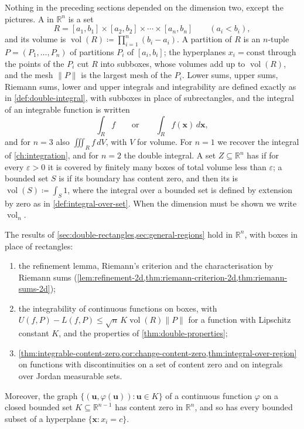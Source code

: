 Nothing in the preceding sections depended on the dimension two, except the pictures. A  in $\mathbb R^n$ is a set
\[
R=[a_1,b_1]\times[a_2,b_2]\times\cdots\times[a_n,b_n]\qquad(a_i<b_i),
\]
and its volume is $\operatorname{vol}(R)\coloneqq\prod_{i=1}^n(b_i-a_i)$. A partition of $R$ is an $n$-tuple $P=(P_1,\ldots,P_n)$ of partitions $P_i$ of $[a_i,b_i]$; the hyperplanes $x_i=\text{const}$ through the points of the $P_i$ cut $R$ into subboxes, whose volumes add up to $\operatorname{vol}(R)$, and the mesh $\|P\|$ is the largest mesh of the $P_i$. Lower sums, upper sums, Riemann sums, lower and upper integrals and integrability are defined exactly as in \cref{def:double-integral}, with subboxes in place of subrectangles, and the integral of an integrable function is written
\[
\int_Rf\qquad\text{or}\qquad\int_Rf(\mathbf x)\,d\mathbf x ,
\]
and for $n=3$ also $\iiint_Rf\,dV$, with $V$ for volume. For $n=1$ we recover the integral of \cref{ch:integration}, and for $n=2$ the double integral. A set $Z\subseteq\mathbb R^n$ has  if for every $\varepsilon>0$ it is covered by finitely many boxes of total volume less than $\varepsilon$; a bounded set $S$ is  if its boundary has content zero, and then its  is $\operatorname{vol}(S)\coloneqq\int_S1$, where the integral over a bounded set is defined by extension by zero as in \cref{def:integral-over-set}. When the dimension must be shown we write $\operatorname{vol}_n$.

\begin{theorem}
\label{thm:multiple-summary}
The results of \cref{sec:double-rectangles,sec:general-regions} hold in $\mathbb R^n$, with boxes in place of rectangles:
\begin{enumerate}
\item the refinement lemma, Riemann's criterion and the characterisation by Riemann sums (\cref{lem:refinement-2d,thm:riemann-criterion-2d,thm:riemann-sums-2d});
\item the integrability of continuous functions on boxes, with $U(f,P)-L(f,P)\le\sqrt n\,K\operatorname{vol}(R)\|P\|$ for a function with Lipschitz constant $K$, and the properties of \cref{thm:double-properties};
\item \cref{thm:integrable-content-zero,cor:change-content-zero,thm:integral-over-region} on functions with discontinuities on a set of content zero and on integrals over Jordan measurable sets.
\end{enumerate}
Moreover, the graph $\{(\mathbf u,\varphi(\mathbf u)): \mathbf u\in K\}$ of a continuous function $\varphi$ on a closed bounded set $K\subseteq\mathbb R^{n-1}$ has content zero in $\mathbb R^n$, and so has every bounded subset of a hyperplane $\{\mathbf x: x_i=c\}$.
\end{theorem}

